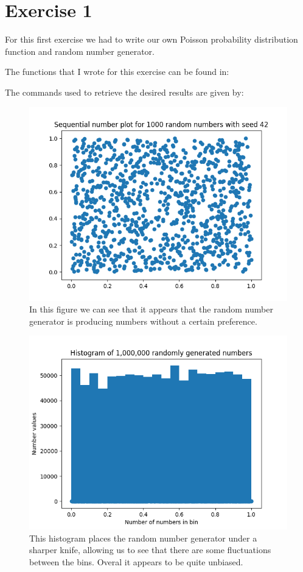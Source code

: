 \section{Exercise 1}

For this first exercise we had to write our own Poisson probability distribution function and random number generator. 

The functions that I wrote for this exercise can be found in: 

The commands used to retrieve the desired results are given by:

\begin{figure}[h!]
  \centering
  \includegraphics[width=0.9\linewidth]{./plots/1_b_1.png}
  \caption{In this figure we can see that it appears that the random number generator is producing numbers without a certain preference.}
  \label{fig:fig1.1}
\end{figure}

\begin{figure}[h!]
  \centering
  \includegraphics[width=0.9\linewidth]{./plots/1_b_2.png}
  \caption{This histogram places the random number generator under a sharper knife, allowing us to see that there are some fluctuations between the bins. Overal it appears to be quite unbiased.}
  \label{fig:fig1.2}
\end{figure}
